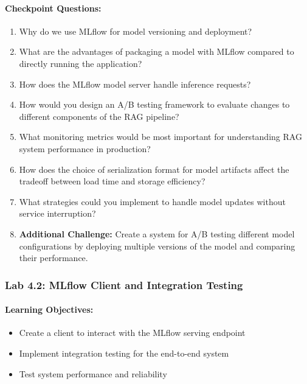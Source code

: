 \documentclass[
  screen,review,acmlarge]{acmart}
\providecommand{\tightlist}{%
  \setlength{\itemsep}{0pt}\setlength{\parskip}{0pt}}
\begin{document}
\paragraph{Checkpoint Questions:}\label{checkpoint-questions-8}

\begin{enumerate}
\def\labelenumi{\arabic{enumi}.}
\tightlist
\item
  Why do we use MLflow for model versioning and deployment?
\item
  What are the advantages of packaging a model with MLflow compared to directly running the application?
\item
  How does the MLflow model server handle inference requests?
\item
  How would you design an A/B testing framework to evaluate changes to different components of the RAG pipeline?
\item
  What monitoring metrics would be most important for understanding RAG system performance in production?
\item
  How does the choice of serialization format for model artifacts affect the tradeoff between load time and storage efficiency?
\item
  What strategies could you implement to handle model updates without service interruption?
\item
  \textbf{Additional Challenge:} Create a system for A/B testing different model configurations by deploying multiple versions of the model and comparing their performance.
\end{enumerate}

\subsubsection{Lab 4.2: MLflow Client and Integration Testing}\label{lab-4.2-mlflow-client-and-integration-testing}

\paragraph{Learning Objectives:}\label{learning-objectives-11}

\begin{itemize}
\tightlist
\item
  Create a client to interact with the MLflow serving endpoint
\item
  Implement integration testing for the end-to-end system
\item
  Test system performance and reliability
\end{itemize}
\end{document}
